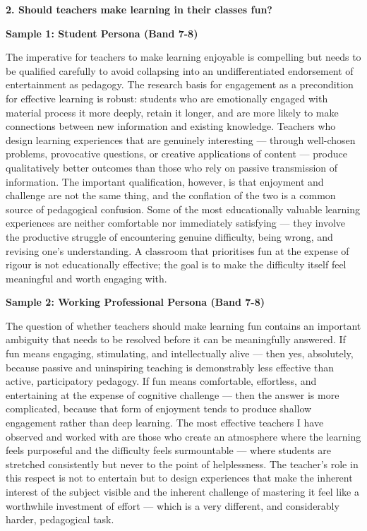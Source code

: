 \separator

\begin{ieltsquestion}
\textbf{2. Should teachers make learning in their classes fun?}
\end{ieltsquestion}
\textbf{Sample 1: Student Persona (Band 7-8)}

The imperative for teachers to make learning enjoyable is compelling but needs to be qualified carefully to avoid collapsing into an undifferentiated endorsement of entertainment as pedagogy. The research basis for engagement as a precondition for effective learning is robust: students who are emotionally engaged with material process it more deeply, retain it longer, and are more likely to make connections between new information and existing knowledge. Teachers who design learning experiences that are genuinely interesting — through well-chosen problems, provocative questions, or creative applications of content — produce qualitatively better outcomes than those who rely on passive transmission of information. The important qualification, however, is that enjoyment and challenge are not the same thing, and the conflation of the two is a common source of pedagogical confusion. Some of the most educationally valuable learning experiences are neither comfortable nor immediately satisfying — they involve the productive struggle of encountering genuine difficulty, being wrong, and revising one's understanding. A classroom that prioritises fun at the expense of rigour is not educationally effective; the goal is to make the difficulty itself feel meaningful and worth engaging with.

\textbf{Sample 2: Working Professional Persona (Band 7-8)}

The question of whether teachers should make learning fun contains an important ambiguity that needs to be resolved before it can be meaningfully answered. If fun means engaging, stimulating, and intellectually alive — then yes, absolutely, because passive and uninspiring teaching is demonstrably less effective than active, participatory pedagogy. If fun means comfortable, effortless, and entertaining at the expense of cognitive challenge — then the answer is more complicated, because that form of enjoyment tends to produce shallow engagement rather than deep learning. The most effective teachers I have observed and worked with are those who create an atmosphere where the learning feels purposeful and the difficulty feels surmountable — where students are stretched consistently but never to the point of helplessness. The teacher's role in this respect is not to entertain but to design experiences that make the inherent interest of the subject visible and the inherent challenge of mastering it feel like a worthwhile investment of effort — which is a very different, and considerably harder, pedagogical task.


